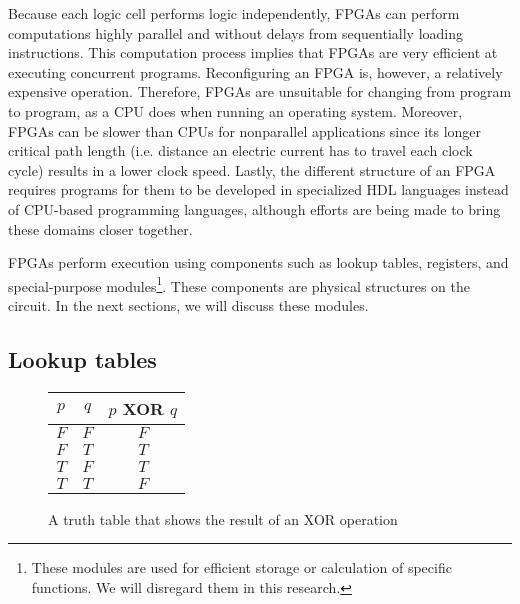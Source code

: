 Because each logic cell performs logic independently, FPGAs can perform computations highly parallel and without delays from sequentially loading instructions. This computation process implies that FPGAs are very efficient at executing concurrent programs. Reconfiguring an FPGA is, however, a relatively expensive operation. Therefore, FPGAs are unsuitable for changing from program to program, as a CPU does when running an operating system. Moreover, FPGAs can be slower than CPUs for nonparallel applications since its longer critical path length (i.e. distance an electric current has to travel each clock cycle) results in a lower clock speed. Lastly, the different structure of an FPGA requires programs for them to be developed in specialized HDL languages instead of CPU-based programming languages, although efforts are being made to bring these domains closer together.

FPGAs perform execution using components such as lookup tables, registers, and special-purpose modules\footnote{These modules are used for efficient storage or calculation of specific functions. We will disregard them in this research.}. These components are physical structures on the circuit. In the next sections, we will discuss these modules.
\subsection{Lookup tables}


\begin{figure}
\centering
\begin{tabular}{|c|c|c|}
\hline
$p$ & $q$ & $p$ XOR $q$ \\ \hline
$F$ & $F$ & $F$       \\ \hline
$F$ & $T$ & $T$       \\ \hline
$T$ & $F$ & $T$       \\ \hline
$T$ & $T$ & $F$       \\ \hline
\end{tabular}
\caption{A truth table that shows the result of an XOR operation}
\label{fig:truth_table}
\end{figure}

